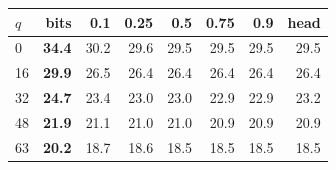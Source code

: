 \begin{tabular}{lrrrrrrr}
\toprule
$q$ & bits & 0.1 & 0.25 & 0.5 & 0.75 & 0.9 & head \\
\midrule
0 & \textbf{34.4} & 30.2 & 29.6 & 29.5 & 29.5 & 29.5 & 29.5 \\
16 & \textbf{29.9} & 26.5 & 26.4 & 26.4 & 26.4 & 26.4 & 26.4 \\
32 & \textbf{24.7} & 23.4 & 23.0 & 23.0 & 22.9 & 22.9 & 23.2 \\
48 & \textbf{21.9} & 21.1 & 21.0 & 21.0 & 20.9 & 20.9 & 20.9 \\
63 & \textbf{20.2} & 18.7 & 18.6 & 18.5 & 18.5 & 18.5 & 18.5 \\
\bottomrule
\end{tabular}
